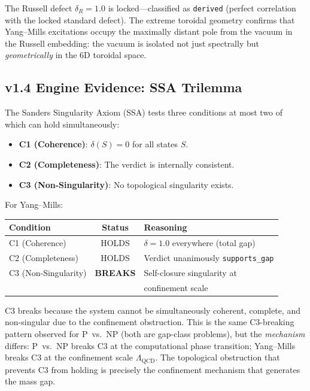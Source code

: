 \documentclass[11pt]{article}
\begin{document}
\noindent
The Russell defect $\delta_R = 1.0$ is locked---classified as
\texttt{derived} (perfect correlation with the locked standard defect).
The extreme toroidal geometry confirms that Yang--Mills excitations
occupy the maximally distant pole from the vacuum in the Russell
embedding: the vacuum is isolated not just spectrally but
\emph{geometrically} in the 6D toroidal space.

\subsection{v1.4 Engine Evidence: SSA Trilemma}

The Sanders Singularity Axiom (SSA) tests three conditions at most two
of which can hold simultaneously:
\begin{itemize}
  \item \textbf{C1 (Coherence)}: $\delta(S) = 0$ for all states $S$.
  \item \textbf{C2 (Completeness)}: The verdict is internally consistent.
  \item \textbf{C3 (Non-Singularity)}: No topological singularity exists.
\end{itemize}

\noindent
For Yang--Mills:
\begin{center}
\begin{tabular}{|l|c|l|}
\hline
\textbf{Condition} & \textbf{Status} & \textbf{Reasoning} \\
\hline
C1 (Coherence) & HOLDS & $\delta = 1.0$ everywhere (total gap) \\
C2 (Completeness) & HOLDS & Verdict unanimously \texttt{supports\_gap} \\
C3 (Non-Singularity) & \textbf{BREAKS} & Self-closure singularity at \\
 & & confinement scale \\
\hline
\end{tabular}
\end{center}

\noindent
C3 breaks because the system cannot be simultaneously coherent,
complete, and non-singular due to the confinement obstruction.  This is
the same C3-breaking pattern observed for P~vs.~NP (both are gap-class
problems), but the \emph{mechanism} differs: P~vs.~NP breaks C3 at the
computational phase transition; Yang--Mills breaks C3 at the
confinement scale $\Lambda_{\mathrm{QCD}}$.  The topological obstruction
that prevents C3 from holding is precisely the confinement mechanism
that generates the mass gap.
\end{document}
